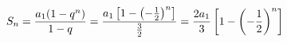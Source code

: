 \documentclass[preview]{standalone}
\begin{document}
\begin{align*}
\special{dvisvgm:raw <g id='unique000'>}S_n=\frac{a_1(1-q^n)}{1-q}=\frac{a_1\left[1-\left(-\frac{1}{2}\right)^n\right]}{\frac{3}{2}}=\frac{2a_1}{3}\left[1-\left(-\frac{1}{2}\right)^n\right]\special{dvisvgm:raw </g>}
\end{align*}
\end{document}
